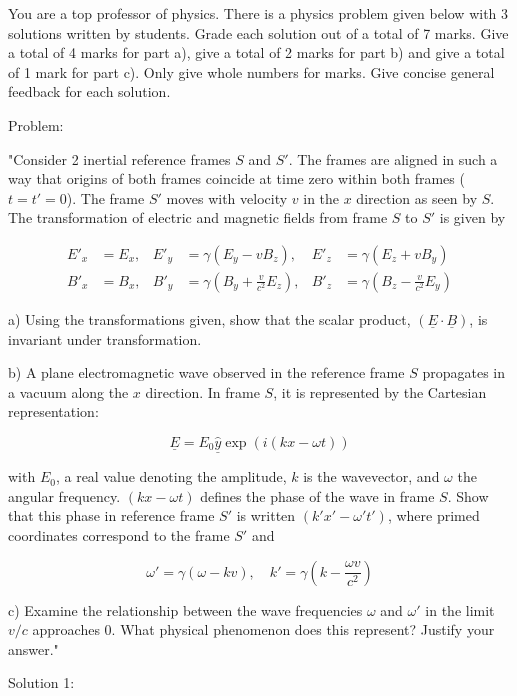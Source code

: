 You are a top professor of physics. There is a physics problem given below with 3 solutions written by students. Grade each solution out of a total of 7 marks. Give a total of 4 marks for part a), give a total of 2 marks for part b) and give a total of 1 mark for part c). Only give whole numbers for marks. Give concise general feedback for each solution. 

Problem:

"Consider 2 inertial reference frames \( S \) and \( S' \). The frames are aligned in such a way that origins of both frames coincide at time zero within both frames (\( t = t' = 0 \)). The frame \( S' \) moves with velocity \( v \) in the \( x \) direction as seen by \( S \). The transformation of electric and magnetic fields from frame \( S \) to \( S' \) is given by 

\[
\begin{aligned}
E'_{x} &= E_{x}, & E'_{y} &= \gamma(E_{y} - vB_{z}), & E'_{z} &= \gamma(E_{z} + vB_{y}) \\
B'_{x} &= B_{x}, & B'_{y} &= \gamma(B_{y} + \frac{v}{c^{2}} E_{z}), & B'_{z} &= \gamma(B_{z} - \frac{v}{c^{2}} E_{y})
\end{aligned}
\]

a) Using the transformations given, show that the scalar product, \( (\underline{E} \cdot \underline{B}) \), is invariant under transformation.

b) A plane electromagnetic wave observed in the reference frame \( S \) propagates in a vacuum along the \( x \) direction. In frame \( S \), it is represented by the Cartesian representation: 

\[ \underline{E} = E_{0} \hat{\underline{y}} \exp(i(kx - \omega t)) \]

with \( E_{0} \), a real value denoting the amplitude, \( k \) is the wavevector, and \( \omega \) the angular frequency. \( (kx - \omega t) \) defines the phase of the wave in frame \( S \). Show that this phase in reference frame \( S' \) is written \( (k'x' - \omega' t') \), where primed coordinates correspond to the frame \( S' \) and

\[ \omega' = \gamma(\omega - kv), \quad k' = \gamma(k - \frac{\omega v}{c^{2}}) \]

c) Examine the relationship between the wave frequencies \( \omega \) and \( \omega' \) in the limit \( v/c \) approaches \( 0 \). What physical phenomenon does this represent? Justify your answer."

Solution 1: 

